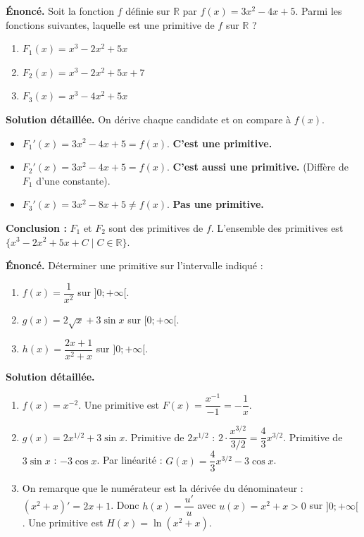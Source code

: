 \documentclass[11pt]{article}
\begin{document}
\begin{exoresolu}
\textbf{Énoncé.} Soit la fonction $f$ définie sur $\mathbb{R}$ par $f(x)=3x^2-4x+5$. 
Parmi les fonctions suivantes, laquelle est une primitive de $f$ sur $\mathbb{R}$ ?
\begin{enumerate}
    \item $F_1(x)=x^3-2x^2+5x$
    \item $F_2(x)=x^3-2x^2+5x+7$
    \item $F_3(x)=x^3-4x^2+5x$
\end{enumerate}
\textbf{Solution détaillée.}
On dérive chaque candidate et on compare à $f(x)$.
\begin{itemize}
    \item $F_1'(x)=3x^2-4x+5 = f(x)$. \textbf{C'est une primitive.}
    \item $F_2'(x)=3x^2-4x+5 = f(x)$. \textbf{C'est aussi une primitive.} (Diffère de $F_1$ d'une constante).
    \item $F_3'(x)=3x^2-8x+5 \neq f(x)$. \textbf{Pas une primitive.}
\end{itemize}
\textbf{Conclusion :} $F_1$ et $F_2$ sont des primitives de $f$. L'ensemble des primitives est $\{x^3-2x^2+5x+C \mid C \in \mathbb{R}\}$.
\end{exoresolu}

\begin{exoresolu}
\textbf{Énoncé.} Déterminer une primitive sur l'intervalle indiqué :
\begin{enumerate}
    \item $f(x)=\dfrac{1}{x^2}$ sur $]0;+\infty[$.
    \item $g(x)=2\sqrt{x}+3\sin x$ sur $[0;+\infty[$.
    \item $h(x)=\dfrac{2x+1}{x^2+x}$ sur $]0;+\infty[$.
\end{enumerate}
\textbf{Solution détaillée.}
\begin{enumerate}
    \item $f(x)=x^{-2}$. Une primitive est $F(x)=\dfrac{x^{-1}}{-1}=-\dfrac{1}{x}$.
    \item $g(x)=2x^{1/2}+3\sin x$. 
    Primitive de $2x^{1/2}$ : $2 \cdot \dfrac{x^{3/2}}{3/2} = \dfrac{4}{3}x^{3/2}$.
    Primitive de $3\sin x$ : $-3\cos x$.
    Par linéarité : $G(x)=\dfrac{4}{3}x^{3/2}-3\cos x$.
    \item On remarque que le numérateur est la dérivée du dénominateur : $(x^2+x)'=2x+1$.
    Donc $h(x)=\dfrac{u'}{u}$ avec $u(x)=x^2+x > 0$ sur $]0;+\infty[$.
    Une primitive est $H(x)=\ln(x^2+x)$.
\end{enumerate}
\end{exoresolu}
\end{document}
